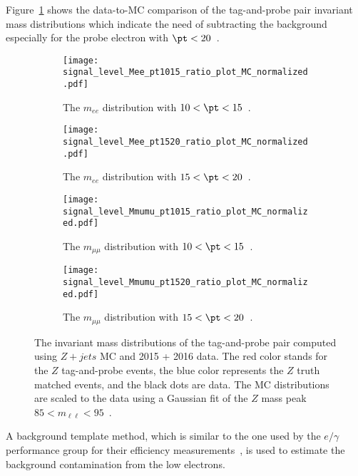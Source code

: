 Figure~\ref{fig:app_RLE_mll_distributions} shows the data-to-MC comparison of the tag-and-probe pair invariant mass distributions which indicate the need of subtracting the background especially for the probe electron with $\pt < 20$~{\GeV}.
%
\begin{figure}[ht]
    \begin{subfigure}[b]{0.48\textwidth}
        \begin{center}
            \texttt{[image: signal\_level\_Mee\_pt1015\_ratio\_plot\_MC\_normalized.pdf]}
            \caption{The $m_{ee}$ distribution with $10 < \pt < 15$~{\GeV}.}
        \end{center}
    \end{subfigure}%
    \begin{subfigure}[b]{0.48\textwidth}
        \begin{center}
            \texttt{[image: signal\_level\_Mee\_pt1520\_ratio\_plot\_MC\_normalized.pdf]}
            \caption{The $m_{ee}$ distribution with $15 < \pt < 20$~{\GeV}.}
        \end{center}
    \end{subfigure}
    \begin{subfigure}[b]{0.48\textwidth}
        \begin{center}
            \texttt{[image: signal\_level\_Mmumu\_pt1015\_ratio\_plot\_MC\_normalized.pdf]}
            \caption{The $m_{\mu\mu}$ distribution with $10 < \pt < 15$~{\GeV}.}
        \end{center}
    \end{subfigure}%
    \begin{subfigure}[b]{0.48\textwidth}
        \begin{center}
            \texttt{[image: signal\_level\_Mmumu\_pt1520\_ratio\_plot\_MC\_normalized.pdf]}
            \caption{The $m_{\mu\mu}$ distribution with $15 < \pt < 20$~{\GeV}.}
        \end{center}
    \end{subfigure}
    \caption{The invariant mass distributions of the tag-and-probe pair computed using $Z+jets$ MC and 2015 + 2016 data.
    The red color stands for the $Z$ tag-and-probe events, the blue color represents the $Z$ truth matched events, and the black dots are data.
    The MC distributions are scaled to the data using a Gaussian fit of the $Z$ mass peak $85 < m_{\ell \ell} < 95$~{\GeV}.}
    \label{fig:app_RLE_mll_distributions}
\end{figure}
%
A background template method, which is similar to the one used by the $e/\gamma$ performance group for their efficiency measurements~\cite{ATLAS-CONF-2014-018}, is used to estimate the background contamination from the low \pt electrons.
